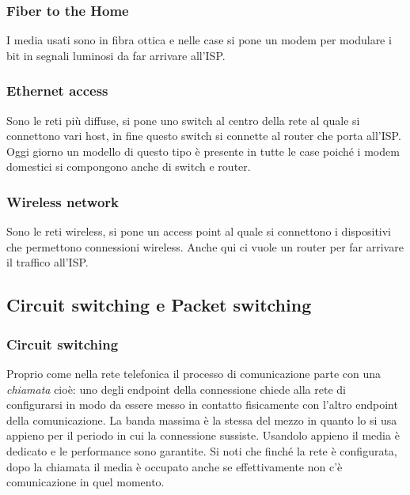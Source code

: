 \subsubsection{Fiber to the Home}
I media usati sono in fibra ottica e nelle case si pone un modem per modulare i bit in segnali luminosi da far arrivare all'ISP.

\subsubsection{Ethernet access}
Sono le reti più diffuse, si pone uno switch al centro della rete al quale si connettono vari host, in fine questo switch si connette al router che porta all'ISP. Oggi giorno un modello di questo tipo è presente in tutte le case poiché i modem domestici si compongono anche di switch e router.

\subsubsection{Wireless network}
Sono le reti wireless, si pone un access point al quale si connettono i dispositivi che permettono connessioni wireless. Anche qui ci vuole un router per far arrivare il traffico all'ISP.

\subsection{Circuit switching e Packet switching}
\subsubsection{Circuit switching}
Proprio come nella rete telefonica il processo di comunicazione parte con una \emph{chiamata} cioè: uno degli endpoint della connessione chiede alla rete di configurarsi in modo da essere messo in contatto fisicamente con l'altro endpoint della comunicazione.
La banda massima è la stessa del mezzo in quanto lo si usa appieno per il periodo in cui la connessione sussiste. Usandolo appieno il media è dedicato e le performance sono garantite. Si noti che finché la rete è configurata, dopo la chiamata il media è occupato anche se effettivamente non c'è comunicazione in quel momento.

